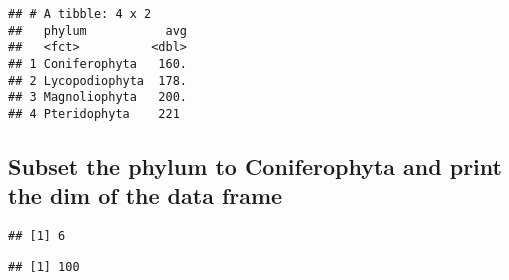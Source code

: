 \documentclass[
]{article}
\begin{document}
\begin{verbatim}
## # A tibble: 4 x 2
##   phylum           avg
##   <fct>          <dbl>
## 1 Coniferophyta   160.
## 2 Lycopodiophyta  178.
## 3 Magnoliophyta   200.
## 4 Pteridophyta    221
\end{verbatim}

\hypertarget{subset-the-phylum-to-coniferophyta-and-print-the-dim-of-the-data-frame}{%
\subsection{Subset the phylum to Coniferophyta and print the dim of the
data
frame}\label{subset-the-phylum-to-coniferophyta-and-print-the-dim-of-the-data-frame}}

\begin{verbatim}
## [1] 6
\end{verbatim}

\begin{verbatim}
## [1] 100
\end{verbatim}
\end{document}
